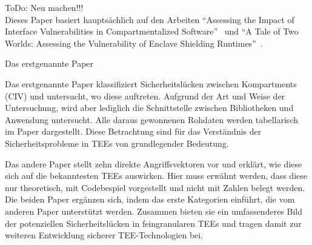 ToDo: Neu machen!!!\\



Dieses Paper basiert hauptsächlich auf den Arbeiten \enquote{Assessing the Impact of Interface Vulnerabilities in Compartmentalized Software}~\cite{CIVPaper} und \enquote{A Tale of Two Worlds: Assessing the Vulnerability of Enclave Shielding Runtimes}~\cite{TEEPaper}. 

Das erstgenannte Paper


Das erstgenannte Paper klassifiziert Sicherheitslücken zwischen Kompartments (CIV) und untersucht, wo diese auftreten. Aufgrund der Art und Weise der Untersuchung, wird aber lediglich die Schnittstelle zwischen Bibliotheken und Anwendung untersucht. 
Alle daraus gewonnenen Rohdaten werden tabellarisch im Paper dargestellt. 
Diese Betrachtung sind für das Verständnis der Sicherheitsprobleme in TEEs von grundlegender Bedeutung.

Das andere Paper stellt zehn direkte Angriffsvektoren vor und erklärt, wie diese sich auf die bekanntesten TEEs auswirken. Hier muss erwähnt werden, dass diese nur theoretisch, mit Codebespiel vorgestellt und nicht mit Zahlen belegt werden.
Die beiden Paper ergänzen sich, indem das erste Kategorien einführt, die vom anderen Paper unterstützt werden. Zusammen bieten sie ein umfassenderes Bild der potenziellen Sicherheitslücken in feingranularen TEEs und tragen damit zur weiteren Entwicklung sicherer TEE-Technologien bei. 
